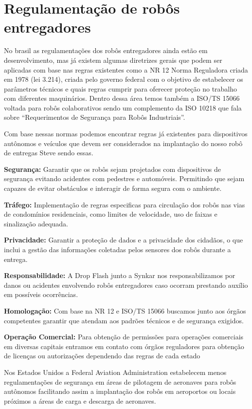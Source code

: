 \chapter{Regulamentação de robôs entregadores}
\label{ch:identificador}

No brasil as regulamentações dos robôs entregadores ainda estão em 
desenvolvimento, mas já existem algumas diretrizes gerais que podem ser  aplicadas com base nas regras existentes como a NR 12 Norma Reguladora \cite{NR12} criada em 1978 (lei 3.214), criada pelo governo federal com o objetivo de estabelecer os parâmetros técnicos e quais regras cumprir para oferecer proteção no trabalho com diferentes maquinários. Dentro dessa área temos também a ISO/TS 15066 \cite{ISO/TS15066} voltada para robôs colaborativos sendo um complemento da ISO 10218 \cite{(ISO10218)} que fala sobre “Requerimentos de Segurança para Robôs Industriais”.

Com base nessas normas podemos encontrar regras já existentes para dispositivos autônomos e veículos que devem ser considerados na implantação do nosso robô de entregas Steve sendo essas.

\textbf{Segurança:} Garantir que os robôs sejam projetados com dispositivos de segurança evitando acidentes com pedestres e automóveis. Permitindo que sejam capazes de evitar obstáculos e interagir de forma segura com o ambiente.

\textbf{Tráfego:} Implementação de regras especificas para circulação dos robôs nas vias de condomínios residenciais, como limites de velocidade, uso de faixas e sinalização adequada.

\textbf{Privacidade:} Garantir a proteção de dados e a privacidade dos cidadãos, o que inclui a gestão das informações coletadas pelos sensores dos robôs durante a entrega.

\textbf{Responsabilidade:} A Drop Flash junto a Synkar nos responsabilizamos por danos ou acidentes envolvendo robôs entregadores caso ocorram prestando auxílio em possíveis ocorrências. 

\textbf{Homologação:} Com base na NR 12 e ISO/TS 15066 buscamos junto aos órgãos competentes garantir que atendam aos padrões técnicos e de segurança exigidos.

\textbf{Operação Comercial:} Para obtenção de permissões para operações comerciais em diversas capitais entramos em contato com órgãos reguladores para obtenção de licenças ou autorizações dependendo das regras de cada estado

Nos Estados Unidos a Federal Aviation Administration \cite{faa2018} estabelecem menos regulamentações de segurança em áreas de pilotagem de aeronaves para robôs autônomos facilitando assim a implantação dos robôs em aeroportos ou locais próximos a áreas de carga e descarga de aeronaves. 